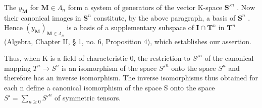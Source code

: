 The \(y_{\mathbf{M}}\) for \(\mathbf{M} \in \Lambda_n\) form a system of generators of the vector K-space \(\mathbf{S}'^n\) . Now their canonical images in \(\mathbf{S}^n\) constitute, by the above paragraph, a basis of \(\mathbf{S}^n\) . Hence \((y_{\mathbf{M}})_{\mathbf{M} \in \Lambda_n}\) is a basis of a supplementary subspace of \(\mathbf{I} \cap \mathbf{T}^n\) in \(\mathbf{T}^n\) (Algebra, Chapter II, § 1, no. 6, Proposition 4), which establishes our assertion.

Thus, when K is a field of characteristic 0, the restriction to \(S'^{n}\) of the canonical mapping \(T^{n} \rightarrow S^{n}\) is an isomorphism of the space \(S'^{n}\) onto the space \(S^{n}\) and therefore has an inverse isomorphism. The inverse isomorphisms thus obtained for each n define a canonical isomorphism of the space S onto the space \(S' = \sum_{n \geqslant 0} S'^{n}\) of symmetric tensors.

